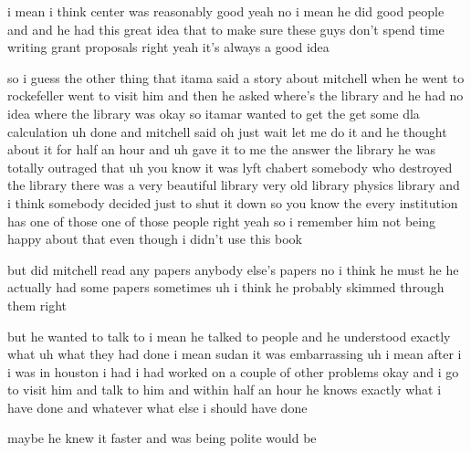 \begin{description}
i mean i think center was reasonably good yeah no i mean he did good people and and he had this great idea that to make sure these guys don't spend time writing grant proposals right yeah it's always a good idea

so i guess the other thing that itama said a story about mitchell when he went to rockefeller went to visit him and then he asked where's the library and he had no idea where the library was okay so itamar wanted to get the get some dla calculation uh done and mitchell said oh just wait let me do it and he thought about it for half an hour and uh gave it to me the answer the library he was totally outraged that uh you know it was lyft chabert somebody who destroyed the library there was a very beautiful library very old library physics library and i think somebody decided just to shut it down so you know the every institution has one of those one of those people right yeah so i remember him not being happy about that even though i didn't use this book

but did mitchell read any papers anybody else's papers no i think he must he he actually had some papers sometimes uh i think he probably skimmed through them right

but he wanted to talk to i mean he talked to people and he understood exactly what uh what they had done i mean sudan it was embarrassing uh i mean after i i was in houston i had i had worked on a couple of other problems okay and i go to visit him and talk to him and within half an hour he knows exactly what i have done and whatever what else i should have done

maybe he knew it faster and was being polite would be


\end{description}
